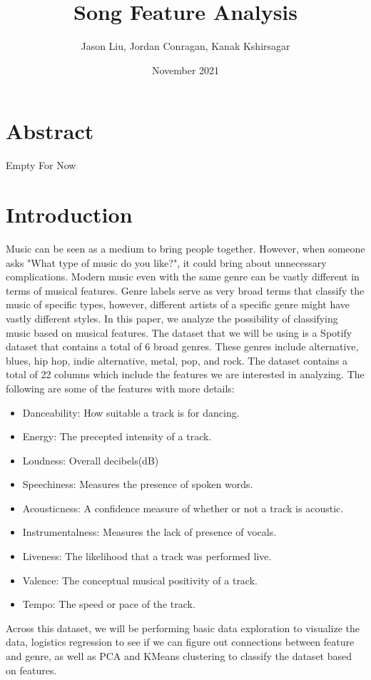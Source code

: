 \documentclass[11pt, a4paper, twocolumn]{article}
\title{Song Feature Analysis}
\author{Jason Liu, Jordan Conragan, Kanak Kshirsagar}
\date{November 2021}
\begin{document}
\maketitle
\section{Abstract}
Empty For Now
\section{Introduction}	
Music can be seen as a medium to bring people together. However, when someone asks "What type of music do you like?", it could bring about unnecessary complications. Modern music even with the same genre can be vastly different in terms of musical features. Genre labels serve as very broad terms that classify the music of specific types, however, different artists of a specific genre might have vastly different styles. In this paper, we analyze the possibility of classifying music based on musical features. 
The dataset that we will be using is a Spotify dataset that contains a total of 6 broad genres. These genres include alternative, blues, hip hop, indie alternative, metal, pop, and rock. The dataset contains a total of 22 columns which include the features we are interested in analyzing. The following are some of the features with more details:
\begin{itemize}
\item Danceability: How suitable a track is for dancing. 
\item Energy: The precepted intensity of a track. 
\item Loudness: Overall decibels(dB)
\item Speechiness: Measures the presence of spoken words.
\item Acousticness: A confidence measure of whether or not a track is acoustic. 
\item Instrumentalness: Measures the lack of presence of vocals. 
\item Liveness: The likelihood that a track was performed live.
\item Valence: The conceptual musical positivity of a track. 
\item Tempo: The speed or pace of the track. 
\end{itemize}
Across this dataset, we will be performing basic data exploration to visualize the data, logistics regression to see if we can figure out connections between feature and genre, as well as PCA and KMeans clustering to classify the dataset based on features. 
\end{document}
